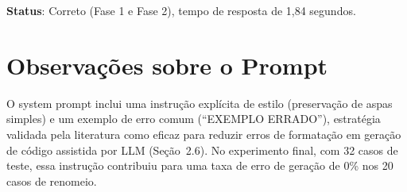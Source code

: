 \textbf{Status}: Correto (Fase 1 e Fase 2), tempo de resposta de 1,84 segundos.

\section{Observações sobre o Prompt}

O system prompt inclui uma instrução explícita de estilo (preservação de aspas simples) e um exemplo de erro comum (``EXEMPLO ERRADO''), estratégia validada pela literatura como eficaz para reduzir erros de formatação em geração de código assistida por LLM (Seção~2.6). No experimento final, com 32 casos de teste, essa instrução contribuiu para uma taxa de erro de geração de 0\% nos 20 casos de renomeio.
